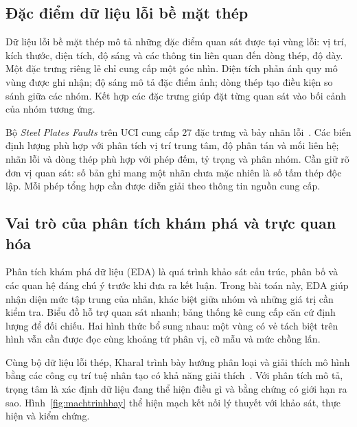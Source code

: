 \documentclass[12pt,a4paper,oneside]{report}
\begin{document}
\subsection{Đặc điểm dữ liệu lỗi bề mặt thép}

Dữ liệu lỗi bề mặt thép mô tả những đặc điểm quan sát được tại vùng lỗi: vị trí, kích thước, diện tích, độ sáng và các thông tin liên quan đến dòng thép, độ dày. Một đặc trưng riêng lẻ chỉ cung cấp một góc nhìn. Diện tích phản ánh quy mô vùng được ghi nhận; độ sáng mô tả đặc điểm ảnh; dòng thép tạo điều kiện so sánh giữa các nhóm. Kết hợp các đặc trưng giúp đặt từng quan sát vào bối cảnh của nhóm tương ứng.

Bộ \textit{Steel Plates Faults} trên UCI cung cấp 27 đặc trưng và bảy nhãn lỗi~\cite{uci}. Các biến định lượng phù hợp với phân tích vị trí trung tâm, độ phân tán và mối liên hệ; nhãn lỗi và dòng thép phù hợp với phép đếm, tỷ trọng và phân nhóm. Cần giữ rõ đơn vị quan sát: số bản ghi mang một nhãn chưa mặc nhiên là số tấm thép độc lập. Mỗi phép tổng hợp cần được diễn giải theo thông tin nguồn cung cấp.

\subsection{Vai trò của phân tích khám phá và trực quan hóa}

Phân tích khám phá dữ liệu (EDA) là quá trình khảo sát cấu trúc, phân bố và các quan hệ đáng chú ý trước khi đưa ra kết luận. Trong bài toán này, EDA giúp nhận diện mức tập trung của nhãn, khác biệt giữa nhóm và những giá trị cần kiểm tra. Biểu đồ hỗ trợ quan sát nhanh; bảng thống kê cung cấp căn cứ định lượng để đối chiếu. Hai hình thức bổ sung nhau: một vùng có vẻ tách biệt trên hình vẫn cần được đọc cùng khoảng tứ phân vị, cỡ mẫu và mức chồng lấn.

Cùng bộ dữ liệu lỗi thép, Kharal trình bày hướng phân loại và giải thích mô hình bằng các công cụ trí tuệ nhân tạo có khả năng giải thích~\cite{kharal}. Với phân tích mô tả, trọng tâm là xác định dữ liệu đang thể hiện điều gì và bằng chứng có giới hạn ra sao. Hình~\ref{fig:machtrinhbay} thể hiện mạch kết nối lý thuyết với khảo sát, thực hiện và kiểm chứng.
\end{document}
